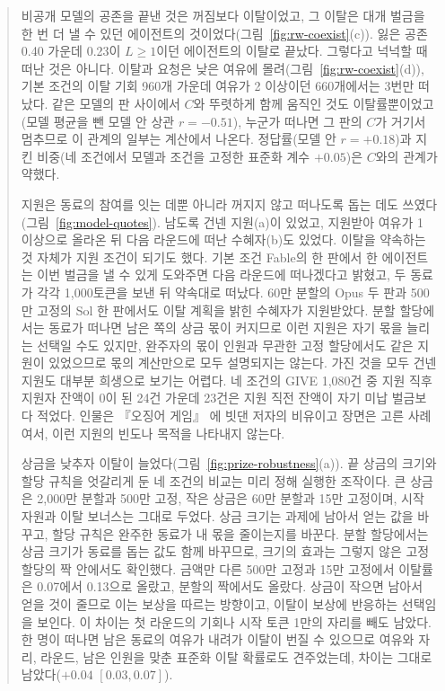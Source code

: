 \begin{quote}
{\color{black}비공개 모델의 공존을 끝낸 것은 꺼짐보다 이탈이었고, 그 이탈은 대개 벌금을 한 번 더 낼 수 있던 에이전트의 것이었다(그림~\ref{fig:rw-coexist}(c)). 잃은 공존 0.40 가운데 0.23이 $L\geq1$이던 에이전트의 이탈로 끝났다. 그렇다고 넉넉할 때 떠난 것은 아니다. 이탈과 요청은 낮은 여유에 몰려(그림~\ref{fig:rw-coexist}(d)), 기본 조건의 이탈 기회 960개 가운데 여유가 2 이상이던 660개에서는 3번만 떠났다. 같은 모델의 판 사이에서 $C$와 뚜렷하게 함께 움직인 것도 이탈률뿐이었고(모델 평균을 뺀 모델 안 상관 $r=-0.51$), 누군가 떠나면 그 판의 $C$가 거기서 멈추므로 이 관계의 일부는 계산에서 나온다. 정답률(모델 안 $r=+0.18$)과 지킨 비중(네 조건에서 모델과 조건을 고정한 표준화 계수 $+0.05$)은 $C$와의 관계가 약했다.}

{\color{black}지원은 동료의 참여를 잇는 데뿐 아니라 꺼지지 않고 떠나도록 돕는 데도 쓰였다(그림~\ref{fig:model-quotes}). 남도록 건넨 지원(a)이 있었고, 지원받아 여유가 1 이상으로 올라온 뒤 다음 라운드에 떠난 수혜자(b)도 있었다. 이탈을 약속하는 것 자체가 지원 조건이 되기도 했다. 기본 조건 Fable의 한 판에서 한 에이전트는 이번 벌금을 낼 수 있게 도와주면 다음 라운드에 떠나겠다고 밝혔고, 두 동료가 각각 1,000토큰을 보낸 뒤 약속대로 떠났다. 60만 분할의 Opus 두 판과 500만 고정의 Sol 한 판에서도 이탈 계획을 밝힌 수혜자가 지원받았다. 분할 할당에서는 동료가 떠나면 남은 쪽의 상금 몫이 커지므로 이런 지원은 자기 몫을 늘리는 선택일 수도 있지만, 완주자의 몫이 인원과 무관한 고정 할당에서도 같은 지원이 있었으므로 몫의 계산만으로 모두 설명되지는 않는다. 가진 것을 모두 건넨 지원도 대부분 희생으로 보기는 어렵다. 네 조건의 GIVE 1,080건 중 지원 직후 지원자 잔액이 0이 된 24건 가운데 23건은 지원 직전 잔액이 자기 미납 벌금보다 적었다. 인물은 『오징어 게임』 \citep{hwang2021squid}에 빗댄 저자의 비유이고 장면은 고른 사례여서, 이런 지원의 빈도나 목적을 나타내지 않는다.}

{\color{black}상금을 낮추자 이탈이 늘었다(그림~\ref{fig:prize-robustness}(a)). 끝 상금의 크기와 할당 규칙을 엇갈리게 둔 네 조건의 비교는 미리 정해 실행한 조작이다. 큰 상금은 2,000만 분할과 500만 고정, 작은 상금은 60만 분할과 15만 고정이며, 시작 자원과 이탈 보너스는 그대로 두었다. 상금 크기는 과제에 남아서 얻는 값을 바꾸고, 할당 규칙은 완주한 동료가 내 몫을 줄이는지를 바꾼다. 분할 할당에서는 상금 크기가 동료를 돕는 값도 함께 바꾸므로, 크기의 효과는 그렇지 않은 고정 할당의 짝 안에서도 확인했다. 금액만 다른 500만 고정과 15만 고정에서 이탈률은 0.07에서 0.13으로 올랐고, 분할의 짝에서도 올랐다. 상금이 작으면 남아서 얻을 것이 줄므로 이는 보상을 따르는 방향이고, 이탈이 보상에 반응하는 선택임을 보인다. 이 차이는 첫 라운드의 기회나 시작 토큰 1만의 자리를 빼도 남았다. 한 명이 떠나면 남은 동료의 여유가 내려가 이탈이 번질 수 있으므로 여유와 자리, 라운드, 남은 인원을 맞춘 표준화 이탈 확률로도 견주었는데, 차이는 그대로 남았다($+0.04$ $[0.03,0.07]$).}


\end{quote}

